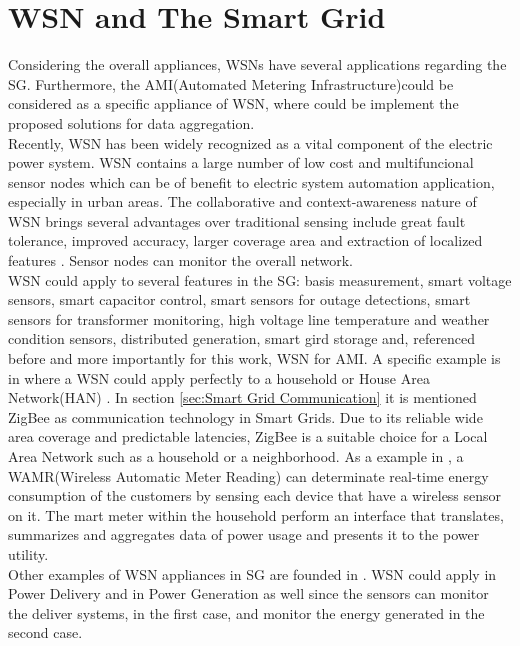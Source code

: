 \section{WSN and  The Smart Grid}
Considering the overall appliances, WSNs have several applications regarding the SG. Furthermore, the AMI(Automated Metering Infrastructure)could be considered as a specific appliance of WSN, where could be implement the proposed solutions for data aggregation.\\
Recently, WSN has been widely  recognized as a vital component of the electric power system\cite{journals/ijdsn/Liu12}. WSN contains a large number of low cost and multifuncional sensor nodes which can be of benefit to electric system automation application, especially in urban areas\cite{RePEc:eee:rensus:v:15:y:2011:i:6:p:2736-2742}. The collaborative and context-awareness nature of WSN brings several advantages over traditional sensing include great fault tolerance, improved accuracy, larger coverage area and extraction of localized features \cite{journals/ijdsn/Liu12}. Sensor nodes can monitor the overall network.\\
WSN could apply to several features in the SG: basis measurement, smart voltage sensors, smart capacitor control, smart sensors for outage detections, smart sensors for transformer monitoring, high voltage line temperature and weather condition sensors, distributed generation, smart gird storage and, referenced before and more importantly for this work, WSN for AMI.
A specific example is in \cite{journals/ijdsn/Liu12} where a WSN could apply perfectly to a household or House Area Network(HAN) . In section \ref{sec:Smart Grid Communication} it is mentioned ZigBee as communication technology in Smart Grids. Due to its reliable wide area coverage and predictable latencies, ZigBee is a suitable choice for a Local Area Network such as a household or a neighborhood. As a example in \cite{journals/ijdsn/Liu12}, a WAMR(Wireless Automatic Meter Reading) can determinate real-time energy consumption of the customers by sensing each device that have a wireless sensor on it. The mart meter within the household perform an interface that translates, summarizes and aggregates data of power usage and presents it to the power utility.\\ 
Other examples of WSN appliances in SG are founded in \cite{journals/ijdsn/Liu12}. WSN could apply in Power Delivery and in Power Generation as well since the sensors can monitor the deliver systems, in the first case, and monitor the energy generated in the second case.\\

